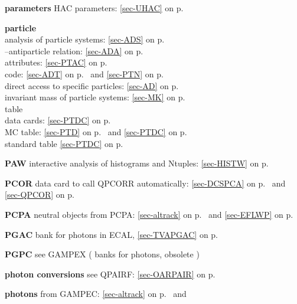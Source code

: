  
 \item{\bf parameters  }HAC parameters: \ref{sec-UHAC} on p.~\pageref{sec-UHAC}\\
 \item{\bf particle}\\
 \subitem analysis of particle systems: \ref{sec-ADS} on p.~\pageref{sec-ADS}\\
 \subitem --antiparticle relation: \ref{sec-ADA} on p.~\pageref{sec-ADA}\\
 \subitem attributes: \ref{sec-PTAC} on p.~\pageref{sec-PTAC}\\
 \subitem code: \ref{sec-ADT} on p.~\pageref{sec-ADT} and
 \ref{sec-PTN} on p.~\pageref{sec-PTN}\\
 \subitem direct access to specific particles: \ref{sec-AD} on p.~\pageref{sec-AD}\\
 \subitem invariant mass of particle systems: \ref{sec-MK} on p.~\pageref{sec-MK}\\
 \subitem table\\
 \subsubitem data cards: \ref{sec-PTDC} on p.~\pageref{sec-PTDC}\\
 \subsubitem MC table: \ref{sec-PTD} on p.~\pageref{sec-PTD} and
 \ref{sec-PTDC} on p.~\pageref{sec-PTDC}\\
 \subsubitem standard table \ref{sec-PTDC} on p.~\pageref{sec-PTDC}\\
 \item{\bf PAW     }interactive analysis of histograms and Ntuples:
 \ref{sec-HISTW} on p.~\pageref{sec-HISTW}\\
 \item{\bf PCOR    }data card to call QPCORR automatically: \ref{sec-DCSPCA} on p.~\pageref{sec-DCSPCA}
                    and \ref{sec-QPCOR} on p.~\pageref{sec-QPCOR}\\
 \item{\bf PCPA }neutral objects from PCPA: \ref{sec-altrack} on p.~\pageref{sec-altrack} and
 \ref{sec-EFLWP} on p.~\pageref{sec-EFLWP}\\
 \item{\bf PGAC    } bank for photons in ECAL, \ref{sec-TVAPGAC} on p.~\pageref{sec-TVAPGAC}\\
 \item{\bf PGPC    }see GAMPEX ( banks for photons, obsolete )\\
 \item{\bf photon conversions } see QPAIRF: \ref{sec-OARPAIR} on p.~\pageref{sec-OARPAIR}\\
 \item{\bf photons} from GAMPEC: \ref{sec-altrack} on p.~\pageref{sec-altrack} and
